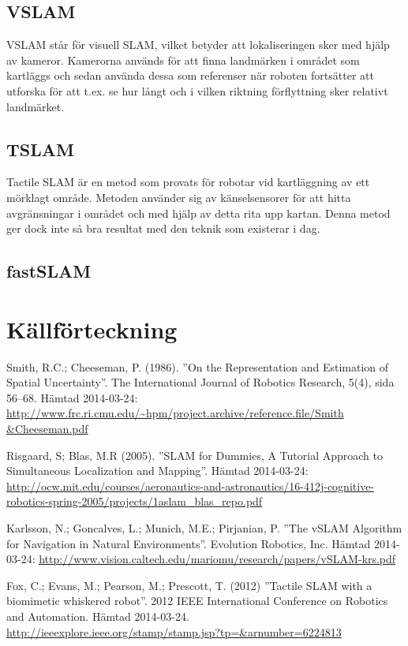 \documentclass[a4paper,12pt,fleqn]{article}
\begin{document}
\subsection{VSLAM}

VSLAM står för visuell SLAM, vilket betyder att lokaliseringen sker med hjälp av kameror. Kamerorna används för att finna landmärken i området som kartläggs och sedan använda dessa som referenser när roboten fortsätter att utforska för att t.ex. se hur långt och i vilken riktning förflyttning sker relativt landmärket.

\subsection{TSLAM}
Tactile SLAM är en metod som provats för robotar vid kartläggning av ett mörklagt område. Metoden använder sig av känselsensorer för att hitta avgränsningar i området och med hjälp av detta rita upp kartan. Denna metod ger dock inte så bra resultat med den teknik som existerar i dag.

\subsection{fastSLAM}




\newpage \section{Källförteckning} Smith, R.C.; Cheeseman, P. (1986).
''On the Representation and Estimation of Spatial Uncertainty''. The
International Journal of Robotics Research, 5(4), sida 56–68. Hämtad
2014-03-24:
\url{http://www.frc.ri.cmu.edu/~hpm/project.archive/reference.file/Smith
&Cheeseman.pdf}

Risgaard, S; Blas, M.R (2005).
''SLAM for Dummies, A Tutorial Approach to Simultaneous Localization and Mapping''. 
Hämtad 2014-03-24:
\url{http://ocw.mit.edu/courses/aeronautics-and-astronautics/16-412j-cognitive-robotics-spring-2005/projects/1aslam_blas_repo.pdf}

Karlsson, N.; Goncalves, L.; Munich, M.E.; Pirjanian, P.
''The vSLAM Algorithm for Navigation in Natural Environments''. Evolution Robotics, Inc. Hämtad 2014-03-24:
\url{http://www.vision.caltech.edu/mariomu/research/papers/vSLAM-krs.pdf}

Fox, C.; Evans, M.; Pearson, M.; Prescott, T. (2012)
''Tactile SLAM with a biomimetic whiskered robot''. 2012 IEEE International Conference on Robotics and Automation. Hämtad 2014-03-24.
\url{http://ieeexplore.ieee.org/stamp/stamp.jsp?tp=&arnumber=6224813}
\end{document}
